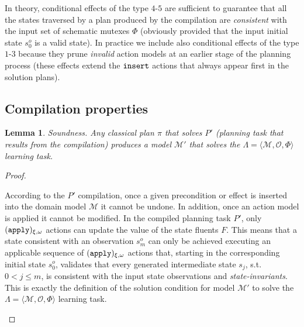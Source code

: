\documentclass{article}
\newcommand{\tup}[1]{{\langle #1 \rangle}}
\newtheorem{mylemma}[mytheorem]{Lemma}
\begin{document}
In theory, conditional effects of the type $4$-$5$ are sufficient to guarantee that all the states traversed by a plan produced by the compilation are {\em consistent} with the input set of schematic mutexes $\Phi$ (obviously provided that the input initial state $s_0^o$ is a valid state). In practice we include also conditional effects of the type $1$-$3$ because they prune {\em invalid} action models at an earlier stage of the planning process (these effects extend the ${\tt \small insert}$ actions that always appear first in the solution plans).



\subsection{Compilation properties}
\begin{mylemma}
Soundness. Any classical plan $\pi$ that solves $P'$ (planning task that results from the compilation) produces a model $\mathcal{M'}$ that solves the $\Lambda=\tup{\mathcal{M},{\mathcal O},\Phi}$ learning task.
\end{mylemma}

\begin{proof}[Proof]
\begin{small}
According to the $P'$ compilation, once a given precondition or effect is inserted into the domain model $\mathcal{M}$ it cannot be undone. In addition, once an action model is applied it cannot be modified. In the compiled planning task $P'$, only ${\tt \small (apply)_{\xi,\omega}}$ actions can update the value of the state fluents $F$. This means that a state consistent with an observation $s_m^o$ can only be achieved executing an applicable sequence of ${\tt \small (apply)_{\xi,\omega}}$ actions that, starting in the corresponding initial state $s_0^o$, validates that every generated intermediate state $s_j$, s.t. $0 < j\leq m$, is consistent with the input state observations and {\em state-invariants}. This is exactly the definition of the solution condition for model $\mathcal{M}'$ to solve the $\Lambda=\tup{\mathcal{M},{\mathcal O},\Phi}$ learning task.
\end{small}
\end{proof}
\end{document}
